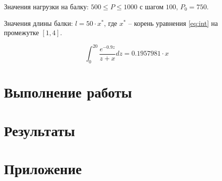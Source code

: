 Значения нагрузки на балку: $500 \le P \le 1000$ с шагом $100$, $P_0 = 750$.

Значения длины балки: $l = 50\cdot x^*$, где $x^*$ -- корень уравнения \ref{eq:int} на промежутке $[1, 4]$.

\begin{equation}\label{eq:int}
\int_0^{20} \frac{e^{-0.9z}}{z+x}dz = 0.1957981\cdot x
\end{equation}

\section{Выполнение работы}

\section{Результаты}

\section*{Приложение}





